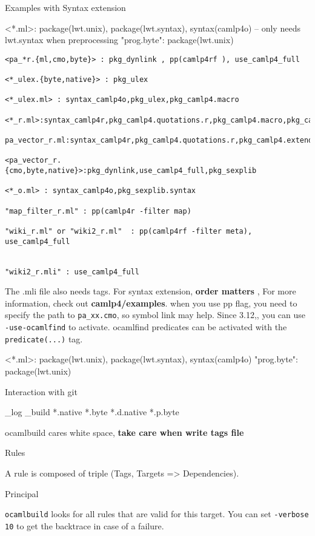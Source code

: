 Examples with Syntax extension 
\begin{bluetext}
<*.ml>: package(lwt.unix), package(lwt.syntax), syntax(camlp4o) -- only needs lwt.syntax when preprocessing
"prog.byte": package(lwt.unix)
\end{bluetext}

\begin{Verbatim}
<pa_*r.{ml,cmo,byte}> : pkg_dynlink , pp(camlp4rf ), use_camlp4_full

<*_ulex.{byte,native}> : pkg_ulex 

<*_ulex.ml> : syntax_camlp4o,pkg_ulex,pkg_camlp4.macro  

<*_r.ml>:syntax_camlp4r,pkg_camlp4.quotations.r,pkg_camlp4.macro,pkg_camlp4.extend 

pa_vector_r.ml:syntax_camlp4r,pkg_camlp4.quotations.r,pkg_camlp4.extend,pkg_sexplib.syntax

<pa_vector_r.{cmo,byte,native}>:pkg_dynlink,use_camlp4_full,pkg_sexplib 

<*_o.ml> : syntax_camlp4o,pkg_sexplib.syntax 

"map_filter_r.ml" : pp(camlp4r -filter map)

"wiki_r.ml" or "wiki2_r.ml"  : pp(camlp4rf -filter meta), use_camlp4_full


"wiki2_r.mli" : use_camlp4_full 
\end{Verbatim}

The .mli file also needs tags. For syntax extension, \textbf{order
  matters} , For more information, check out \textbf{
  camlp4/examples}. when you use pp flag, you need to specify the path
to \verb|pa_xx.cmo|, so symbol link may help.  Since 3.12,, you can
use \verb|-use-ocamlfind| to activate. ocamlfind predicates can be
activated with the \verb|predicate(...)| tag.
\begin{bluetext}
  <*.ml>: package(lwt.unix), package(lwt.syntax), syntax(camlp4o)
"prog.byte": package(lwt.unix)
\end{bluetext}


Interaction with git
\begin{bluetext}
_log
_build
*.native
*.byte
*.d.native
*.p.byte  
\end{bluetext}
ocamlbuild cares white space, \textbf{ take care when write tags file}


Rules 

A rule is composed of triple (Tags, Targets => Dependencies).

Principal 

\verb|ocamlbuild| looks for all rules that are valid for this target.
You can set \verb|-verbose 10| to get the backtrace in case of a
failure.

